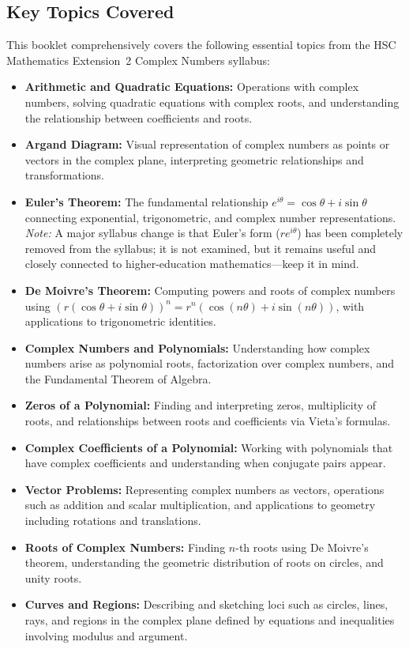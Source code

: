 \documentclass[12pt]{article}
\begin{document}
\subsection{Key Topics Covered}
This booklet comprehensively covers the following essential topics from the HSC Mathematics Extension~2 Complex Numbers syllabus:

\begin{itemize}[leftmargin=*]
  \item \textbf{Arithmetic and Quadratic Equations:} Operations with complex numbers, solving quadratic equations with complex roots, and understanding the relationship between coefficients and roots.
  
  \item \textbf{Argand Diagram:} Visual representation of complex numbers as points or vectors in the complex plane, interpreting geometric relationships and transformations.
  
  \item \textbf{Euler's Theorem:} The fundamental relationship $e^{i\theta} = \cos\theta + i\sin\theta$ connecting exponential, trigonometric, and complex number representations. \textit{Note:} A major syllabus change is that Euler's form ($re^{i\theta}$) has been completely removed from the syllabus; it is not examined, but it remains useful and closely connected to higher-education mathematics---keep it in mind.
  
  \item \textbf{De Moivre's Theorem:} Computing powers and roots of complex numbers using $(r(\cos\theta + i\sin\theta))^n = r^n(\cos(n\theta) + i\sin(n\theta))$, with applications to trigonometric identities.
  
  \item \textbf{Complex Numbers and Polynomials:} Understanding how complex numbers arise as polynomial roots, factorization over complex numbers, and the Fundamental Theorem of Algebra.
  
  \item \textbf{Zeros of a Polynomial:} Finding and interpreting zeros, multiplicity of roots, and relationships between roots and coefficients via Vieta's formulas.
  
  \item \textbf{Complex Coefficients of a Polynomial:} Working with polynomials that have complex coefficients and understanding when conjugate pairs appear.
  
  \item \textbf{Vector Problems:} Representing complex numbers as vectors, operations such as addition and scalar multiplication, and applications to geometry including rotations and translations.
  
  \item \textbf{Roots of Complex Numbers:} Finding $n$-th roots using De Moivre's theorem, understanding the geometric distribution of roots on circles, and unity roots.
  
  \item \textbf{Curves and Regions:} Describing and sketching loci such as circles, lines, rays, and regions in the complex plane defined by equations and inequalities involving modulus and argument.
\end{itemize}
\end{document}
